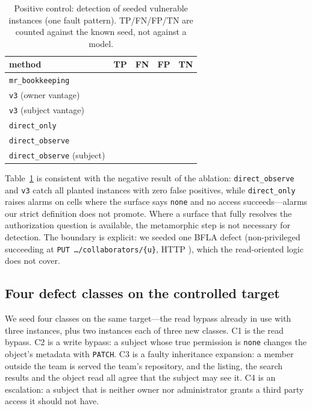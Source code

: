 \begin{table}[t]
\centering
\caption{Positive control: detection of \SeedBolaN{} seeded vulnerable instances
(one fault pattern). TP/FN/FP/TN are counted against the known seed, not against
a model.}
\label{tab:seeded}
\begin{tabular}{lrrrr}
\toprule
method & TP & FN & FP & TN \\
\midrule
\texttt{mr\_bookkeeping} & \SeedTPMrBookkeeping{} & \SeedFNMrBookkeeping{} & \SeedFPMrBookkeeping{} & \SeedTNMrBookkeeping{} \\
\texttt{v3} (owner vantage) & \SeedTPVThree{} & \SeedFNVThree{} & \SeedFPVThree{} & \SeedTNVThree{} \\
\texttt{v3} (subject vantage) & \SeedTPVThreeSelf{} & \SeedFNVThreeSelf{} & \SeedFPVThreeSelf{} & \SeedTNVThreeSelf{} \\
\texttt{direct\_only} & \SeedTPDirectOnly{} & \SeedFNDirectOnly{} & \SeedFPDirectOnly{} & \SeedTNDirectOnly{} \\
\texttt{direct\_observe} & \SeedTPDirectObserve{} & \SeedFNDirectObserve{} & \SeedFPDirectObserve{} & \SeedTNDirectObserve{} \\
\texttt{direct\_observe} (subject) & \SeedTPDirectObserveSelf{} & \SeedFNDirectObserveSelf{} & \SeedFPDirectObserveSelf{} & \SeedTNDirectObserveSelf{} \\
\bottomrule
\end{tabular}
\end{table}

Table~\ref{tab:seeded} is consistent with the negative result of the ablation:
\texttt{direct\_observe} and \texttt{v3} catch all \SeedBolaN{} planted instances with zero
false positives, while \texttt{direct\_only} raises \SeedFPDirectOnly{} alarms on cells where
the surface says \texttt{none} and no access succeeds---alarms our strict definition does not
promote. Where a surface that fully resolves the authorization question is available, the
metamorphic step is not necessary for detection. The boundary is explicit: we seeded one BFLA
defect (non-privileged \SeedBflaActor{} succeeding at \texttt{PUT \dots/collaborators/\{u\}},
HTTP \SeedBflaStatus{}), which the read-oriented logic does not cover.

\subsection{Four defect classes on the controlled target}
\label{sec:multiclass}

We seed four classes on the same target---the read bypass already in use with three
instances, plus two instances each of three new classes. C1 is the read bypass. C2 is a write
bypass: a subject whose true permission is \texttt{none} changes the object's metadata with
\texttt{PATCH}. C3 is a faulty inheritance expansion: a member outside the team is served the
team's repository, and the listing, the search results and the object read all agree that the
subject may see it. C4 is an escalation: a subject that is neither owner nor administrator
grants a third party access it should not have.

